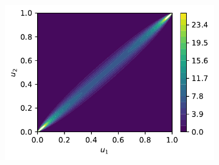 \documentclass[../Thesis.tex]{subfiles}
\begin{document}
\begin{figure}[ht]
    \begin{subfigure}[t]{0.49\textwidth}
        \centering
        \includegraphics[width=\linewidth]{figures/MI estimation/theoretical gaussian copula - rho 0.99 - comparison of methods.pdf}
        \caption{}
    \end{subfigure}
    \caption{}
    \label{fig:density estimate for Jones 1993 and theoretical copula rho 0.99}
\end{figure}



\newpage
\end{document}
